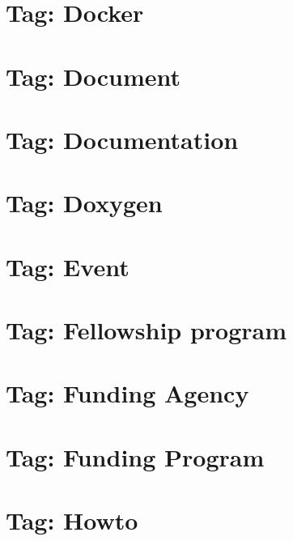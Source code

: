 \documentclass[twoside]{book}
\newcommand{\+}{\discretionary{\mbox{\scriptsize$\hookleftarrow$}}{}{}}
\begin{document}
\chapter{Tag\+: Docker}
\label{md_markdown_tag_docker}

\chapter{Tag\+: Document}
\label{md_markdown_tag_document}

\chapter{Tag\+: Documentation}
\label{md_markdown_tag_documentation}

\chapter{Tag\+: Doxygen}
\label{md_markdown_tag_doxygen}

\chapter{Tag\+: Event}
\label{md_markdown_tag_event}

\chapter{Tag\+: Fellowship program}
\label{md_markdown_tag_fellowship_program}

\chapter{Tag\+: Funding Agency}
\label{md_markdown_tag_funding_agency}

\chapter{Tag\+: Funding Program}
\label{md_markdown_tag_funding_program}

\chapter{Tag\+: Howto}
\label{md_markdown_tag_howto}

\end{document}
